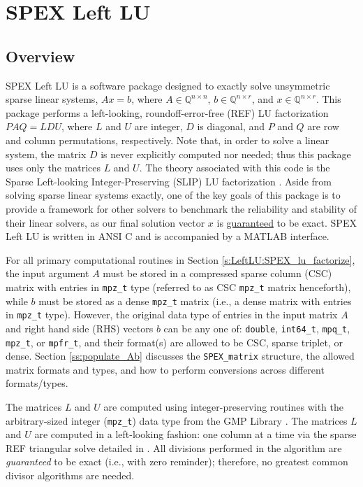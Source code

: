 \documentclass[12pt]{report}
\theoremstyle{definition}
\begin{document}
\chapter{SPEX Left LU} \label{ch:LeftLU}

\section{Overview} \label{s:LeftLU:intro}

SPEX Left LU is a software package designed to exactly solve unsymmetric sparse
linear systems, $ A x = b$, where $A \in \mathbb{Q}^{n \times
n}$, $b \in \mathbb{Q}^{n \times r}$, and $x \in \mathbb{Q}^{n \times
r}$. This package performs a left-looking, roundoff-error-free (REF) LU
factorization $P A Q = L D U$, where $L$ and $U$ are integer, $D$ is diagonal,
and $P$ and $Q$ are row and column permutations, respectively.
Note that, in order to solve a linear system, the matrix $D$ is never explicitly computed nor needed; thus this
package uses only the matrices $L$ and $U$. The theory associated with this code is the Sparse Left-looking Integer-Preserving (SLIP) LU factorization
 \cite{lourenco2019exact}. Aside from
solving sparse linear systems exactly, one of the key goals of this package is
to provide a framework for other solvers to benchmark the reliability and
stability of their linear solvers, as our final solution vector $x$ is
\ul{guaranteed} to be exact. SPEX Left LU is written in ANSI C and is accompanied by a MATLAB interface.

For all primary computational routines in Section \ref{s:LeftLU:SPEX_lu_factorize}, the input
argument $A$ must be stored in a compressed sparse column (CSC) matrix with
entries in \verb|mpz_t| type (referred to as CSC \verb|mpz_t| matrix henceforth), while $b$ must be stored as a dense \verb|mpz_t| matrix (i.e., a
dense matrix with entries in \verb|mpz_t| type).  However, the original data type of entries in the input matrix $A$ and right hand side (RHS) vectors $b$ can be any one of: \verb|double|, \verb|int64_t|, \verb|mpq_t|,
\verb|mpz_t|, or \verb|mpfr_t|, and their format(s) are allowed to be
CSC, sparse triplet, or dense. Section \ref{ss:populate_Ab} discusses the \verb|SPEX_matrix| structure, the allowed matrix formats and types, and how to perform conversions across different formats/types.

The matrices $L$ and $U$ are computed using integer-preserving
routines with the arbitrary-sized integer (\verb|mpz_t|) data type from the GMP Library
\cite{granlund2015gnu}. The matrices $L$ and $U$ are computed in a left-looking fashion: one column at a
time via the sparse REF triangular solve
detailed in \cite{lourenco2019exact}. All divisions performed in the algorithm
are \textit{guaranteed} to be exact (i.e., with zero reminder); therefore, no greatest common
divisor algorithms are needed.
\end{document}
